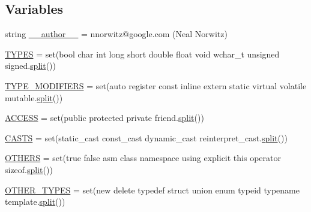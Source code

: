 \subsection*{Variables}
\begin{DoxyCompactItemize}
\item 
string \mbox{\hyperlink{namespacescripts_1_1generator_1_1cpp_1_1keywords_ae480add1f8f173332f7b40600fad3494}{\+\_\+\+\_\+author\+\_\+\+\_\+}} = \textquotesingle{}nnorwitz@google.\+com (Neal Norwitz)\textquotesingle{}
\item 
\mbox{\hyperlink{namespacescripts_1_1generator_1_1cpp_1_1keywords_accb4fe6c0a64f9e93316936fd7f06dda}{T\+Y\+P\+ES}} = set(\textquotesingle{}bool char int long short double float void wchar\+\_\+t unsigned signed\textquotesingle{}.\mbox{\hyperlink{_input_8h_aec2fd8cd9140a1b535dc54a924396f40}{split}}())
\item 
\mbox{\hyperlink{namespacescripts_1_1generator_1_1cpp_1_1keywords_a5701189245469d377e3c10975a7dc9cf}{T\+Y\+P\+E\+\_\+\+M\+O\+D\+I\+F\+I\+E\+RS}} = set(\textquotesingle{}auto register const inline extern static virtual volatile mutable\textquotesingle{}.\mbox{\hyperlink{_input_8h_aec2fd8cd9140a1b535dc54a924396f40}{split}}())
\item 
\mbox{\hyperlink{namespacescripts_1_1generator_1_1cpp_1_1keywords_a811f6a4463b0622f9beb5409130bce26}{A\+C\+C\+E\+SS}} = set(\textquotesingle{}public protected private friend\textquotesingle{}.\mbox{\hyperlink{_input_8h_aec2fd8cd9140a1b535dc54a924396f40}{split}}())
\item 
\mbox{\hyperlink{namespacescripts_1_1generator_1_1cpp_1_1keywords_a4dbcc0ae0c7f141efaab31fd12ab4c04}{C\+A\+S\+TS}} = set(\textquotesingle{}static\+\_\+cast const\+\_\+cast dynamic\+\_\+cast reinterpret\+\_\+cast\textquotesingle{}.\mbox{\hyperlink{_input_8h_aec2fd8cd9140a1b535dc54a924396f40}{split}}())
\item 
\mbox{\hyperlink{namespacescripts_1_1generator_1_1cpp_1_1keywords_ac69b37e3a47ecf42d14d9feda7375f13}{O\+T\+H\+E\+RS}} = set(\textquotesingle{}true false asm class namespace using explicit this operator sizeof\textquotesingle{}.\mbox{\hyperlink{_input_8h_aec2fd8cd9140a1b535dc54a924396f40}{split}}())
\item 
\mbox{\hyperlink{namespacescripts_1_1generator_1_1cpp_1_1keywords_a77fb6248dd11a440da41672472f77d74}{O\+T\+H\+E\+R\+\_\+\+T\+Y\+P\+ES}} = set(\textquotesingle{}new delete typedef struct union enum typeid typename template\textquotesingle{}.\mbox{\hyperlink{_input_8h_aec2fd8cd9140a1b535dc54a924396f40}{split}}())

\end{DoxyCompactItemize}
